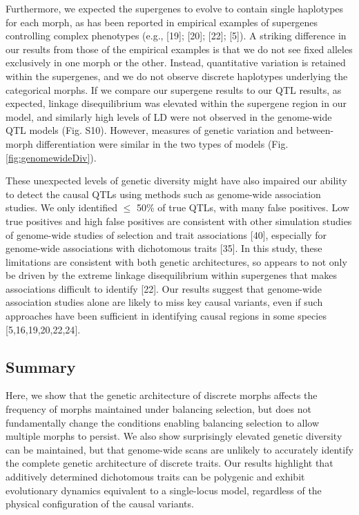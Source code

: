 \documentclass[
  11pt,
  a4paper,
]{article}
\begin{document}
Furthermore, we expected the supergenes to evolve to contain single
haplotypes for each morph, as has been reported in empirical examples of
supergenes controlling complex phenotypes (e.g.,
{[}19{]};
{[}20{]};
{[}22{]};
{[}5{]}). A striking difference in
our results from those of the empirical examples is that we do not see
fixed alleles exclusively in one morph or the other. Instead,
quantitative variation is retained within the supergenes, and we do not
observe discrete haplotypes underlying the categorical morphs. If we
compare our supergene results to our QTL results, as expected, linkage
disequilibrium was elevated within the supergene region in our model,
and similarly high levels of LD were not observed in the genome-wide QTL
models (Fig. S10). However, measures of genetic variation and
between-morph differentiation were similar in the two types of models
(Fig. \ref{fig:genomewideDiv}).

These unexpected levels of genetic diversity might have also impaired
our ability to detect the causal QTLs using methods such as genome-wide
association studies. We only identified \(\le\) 50\% of true QTLs, with
many false positives. Low true positives and high false positives are
consistent with other simulation studies of genome-wide studies of
selection and trait associations
{[}40{]}, especially for genome-wide
associations with dichotomous traits
{[}35{]}. In this study, these
limitations are consistent with both genetic architectures, so appears
to not only be driven by the extreme linkage disequilibrium within
supergenes that makes associations difficult to identify
{[}22{]}. Our results suggest that
genome-wide association studies alone are likely to miss key causal
variants, even if such approaches have been sufficient in identifying
causal regions in some species
{[}5,16,19,20,22,24{]}.

\hypertarget{summary}{%
\subsection{Summary}\label{summary}}

Here, we show that the genetic architecture of discrete morphs affects
the frequency of morphs maintained under balancing selection, but does
not fundamentally change the conditions enabling balancing selection to
allow multiple morphs to persist. We also show surprisingly elevated
genetic diversity can be maintained, but that genome-wide scans are
unlikely to accurately identify the complete genetic architecture of
discrete traits. Our results highlight that additively determined
dichotomous traits can be polygenic and exhibit evolutionary dynamics
equivalent to a single-locus model, regardless of the physical
configuration of the causal variants.
\end{document}
